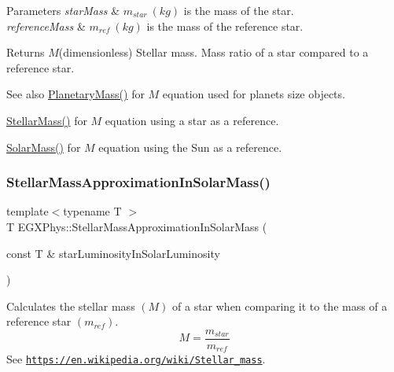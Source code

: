 \begin{DoxyParams}{Parameters}
{\em star\+Mass} & $m_{star}\ (kg)$ is the mass of the star. \\
\hline
{\em reference\+Mass} & $m_{ref}\ (kg)$ is the mass of the reference star. \\
\hline
\end{DoxyParams}
\begin{DoxyReturn}{Returns}
$M$(dimensionless) Stellar mass. Mass ratio of a star compared to a reference star. 
\end{DoxyReturn}
\begin{DoxySeeAlso}{See also}
\mbox{\hyperlink{group___e_g_x_phys-_planetary_mass_ga225bcf56fb37468f6d4d46493d403503}{Planetary\+Mass()}} for $M$ equation used for planets size objects. 

\mbox{\hyperlink{group___e_g_x_phys-_stellar_mass_gabbd6081cd3bfb0153d7470d58f733a61}{Stellar\+Mass()}} for $M$ equation using a star as a reference. 

\mbox{\hyperlink{group___e_g_x_phys-_stellar_mass_gac393d64d586be3dc76ac7a98ac336514}{Solar\+Mass()}} for $M$ equation using the Sun as a reference. 
\end{DoxySeeAlso}
\mbox{\label{group___e_g_x_phys-_stellar_mass_gaa00fb881be48df4eba9838ada6bffa33}} 
\subsubsection{\texorpdfstring{Stellar\+Mass\+Approximation\+In\+Solar\+Mass()}{StellarMassApproximationInSolarMass()}}
{\footnotesize\ttfamily template$<$typename T $>$ \\
T E\+G\+X\+Phys\+::\+Stellar\+Mass\+Approximation\+In\+Solar\+Mass (\begin{DoxyParamCaption}\item[{const T \&}]{star\+Luminosity\+In\+Solar\+Luminosity }\end{DoxyParamCaption})}



Calculates the stellar mass $(M)$ of a star when comparing it to the mass of a reference star $(m_{ref})$. \[M=\frac{m_{star}}{m_{ref}}\] See \href{https://en.wikipedia.org/wiki/Stellar_mass}{\tt https\+://en.\+wikipedia.\+org/wiki/\+Stellar\+\_\+mass}. 


